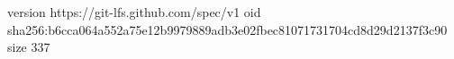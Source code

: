 version https://git-lfs.github.com/spec/v1
oid sha256:b6cca064a552a75e12b9979889adb3e02fbec81071731704cd8d29d2137f3c90
size 337
